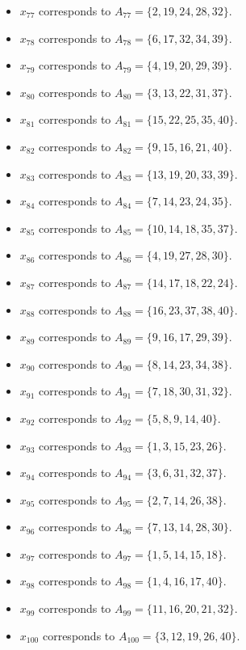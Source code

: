 \documentclass[11pt]{article}
\begin{document}
\begin{itemize}
\item $x_{77}$ corresponds to $A_{77}=\{2, 19, 24, 28, 32\}$.
\item $x_{78}$ corresponds to $A_{78}=\{6, 17, 32, 34, 39\}$.
\item $x_{79}$ corresponds to $A_{79}=\{4, 19, 20, 29, 39\}$.
\item $x_{80}$ corresponds to $A_{80}=\{3, 13, 22, 31, 37\}$.
\item $x_{81}$ corresponds to $A_{81}=\{15, 22, 25, 35, 40\}$.
\item $x_{82}$ corresponds to $A_{82}=\{9, 15, 16, 21, 40\}$.
\item $x_{83}$ corresponds to $A_{83}=\{13, 19, 20, 33, 39\}$.
\item $x_{84}$ corresponds to $A_{84}=\{7, 14, 23, 24, 35\}$.
\item $x_{85}$ corresponds to $A_{85}=\{10, 14, 18, 35, 37\}$.
\item $x_{86}$ corresponds to $A_{86}=\{4, 19, 27, 28, 30\}$.
\item $x_{87}$ corresponds to $A_{87}=\{14, 17, 18, 22, 24\}$.
\item $x_{88}$ corresponds to $A_{88}=\{16, 23, 37, 38, 40\}$.
\item $x_{89}$ corresponds to $A_{89}=\{9, 16, 17, 29, 39\}$.
\item $x_{90}$ corresponds to $A_{90}=\{8, 14, 23, 34, 38\}$.
\item $x_{91}$ corresponds to $A_{91}=\{7, 18, 30, 31, 32\}$.
\item $x_{92}$ corresponds to $A_{92}=\{5, 8, 9, 14, 40\}$.
\item $x_{93}$ corresponds to $A_{93}=\{1, 3, 15, 23, 26\}$.
\item $x_{94}$ corresponds to $A_{94}=\{3, 6, 31, 32, 37\}$.
\item $x_{95}$ corresponds to $A_{95}=\{2, 7, 14, 26, 38\}$.
\item $x_{96}$ corresponds to $A_{96}=\{7, 13, 14, 28, 30\}$.
\item $x_{97}$ corresponds to $A_{97}=\{1, 5, 14, 15, 18\}$.
\item $x_{98}$ corresponds to $A_{98}=\{1, 4, 16, 17, 40\}$.
\item $x_{99}$ corresponds to $A_{99}=\{11, 16, 20, 21, 32\}$.
\item $x_{100}$ corresponds to $A_{100}=\{3, 12, 19, 26, 40\}$.
\end{itemize}
\end{document}
